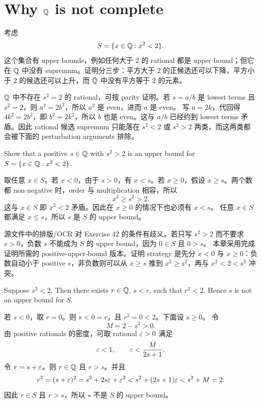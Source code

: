 \section{Why \texorpdfstring{\(\mathbb{Q}\)}{Q} is not complete}

考虑
\[
  S=\{x\in\mathbb{Q}:x^2<2\}.
\]
这个集合有 upper bounds，例如任何大于 \(2\) 的 rational 都是 upper bound；但它在
\(\mathbb{Q}\) 中没有 supremum。证明分三步：平方大于 \(2\) 的正候选还可以下降，平方小于
\(2\) 的候选还可以上升，而 \(\mathbb{Q}\) 中没有平方等于 \(2\) 的元素。

\(\mathbb{Q}\) 中不存在 \(s^2=2\) 的 rational，可按 parity 证明。若 \(s=a/b\) 是 lowest
terms 且 \(s^2=2\)，则 \(a^2=2b^2\)，所以 \(a^2\) 是 even，进而 \(a\) 是 even。
写 \(a=2k\)，代回得 \(4k^2=2b^2\)，即 \(b^2=2k^2\)，所以 \(b\) 也是 even。这与
\(a/b\) 已经约到 lowest terms 矛盾。因此 rational 候选 supremum 只能落在
\(s^2<2\) 或 \(s^2>2\) 两类，而这两类都会被下面的 perturbation arguments 排除。

\begin{exerciseblock}
Show that a positive \(s\in\mathbb{Q}\) with \(s^2>2\) is an upper bound for
\(S=\{x\in\mathbb{Q}:x^2<2\}\).
\end{exerciseblock}

\begin{solution}
取任意 \(x\in S\)。若 \(x<0\)，由于 \(s>0\)，有 \(x<s\)。若 \(x\geq0\)，假设
\(x\geq s\)。两个数都 non-negative 时，order 与 multiplication 相容，所以
\[
  x^2\geq s^2>2.
\]
这与 \(x\in S\) 即 \(x^2<2\) 矛盾。因此在 \(x\geq0\) 的情况下也必须有 \(x<s\)。
任意 \(x\in S\) 都满足 \(x\leq s\)，所以 \(s\) 是 \(S\) 的 upper bound。
\end{solution}

\begin{explanation}
源文件中的排版/OCR 对 Exercise 42 的条件有歧义。若只写 \(s^2>2\) 而不要求
\(s>0\)，负数 \(s\) 不能成为 \(S\) 的 upper bound，因为 \(0\in S\) 且 \(0>s\)。
本章采用完成证明所需的 positive-upper-bound 版本。证明 strategy 是先分
\(x<0\) 与 \(x\geq0\)：负数自动小于 positive \(s\)，非负数则可以从
\(x\geq s\) 推到 \(x^2\geq s^2\)，再与 \(x^2<2<s^2\) 冲突。
\end{explanation}

\begin{exerciseblock}
Suppose \(s^2<2\). Then there exists \(r\in\mathbb{Q}\), \(s<r\), such that
\(r^2<2\). Hence \(s\) is not an upper bound for \(S\).
\end{exerciseblock}

\begin{solution}
若 \(s<0\)，取 \(r=0\)。则 \(s<0=r\)，且 \(r^2=0<2\)。下面设 \(s\geq0\)。
令
\[
  M=2-s^2>0.
\]
由 positive rationals 的密度，可取 rational \(\varepsilon>0\) 满足
\[
  \varepsilon<1,\qquad \varepsilon<\frac{M}{2s+1}.
\]
令 \(r=s+\varepsilon\)。则 \(r\in\mathbb{Q}\) 且 \(r>s\)。并且
\[
  r^2=(s+\varepsilon)^2=s^2+2s\varepsilon+\varepsilon^2
      <s^2+(2s+1)\varepsilon
      <s^2+M=2.
\]
因此 \(r\in S\) 且 \(r>s\)，所以 \(s\) 不是 \(S\) 的 upper bound。
\end{solution}

